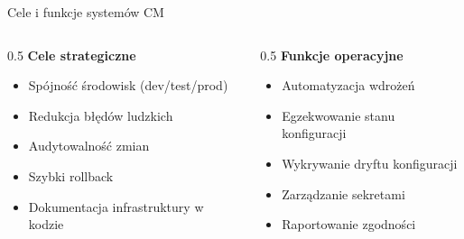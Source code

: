 \documentclass{beamer}
\begin{document}
\begin{frame}{Cele i funkcje system\'ow CM}
    \begin{columns}[T]
        \begin{column}{0.5\textwidth}
            \textbf{Cele strategiczne}
            \begin{itemize}
                \item Sp\'ojno\'s\'c \'{s}rodowisk (dev/test/prod)
                \item Redukcja b\l{}\k{e}d\'ow ludzkich
                \item Audytowalno\'s\'c zmian
                \item Szybki rollback
                \item Dokumentacja infrastruktury w kodzie
            \end{itemize}
        \end{column}
        \begin{column}{0.5\textwidth}
            \textbf{Funkcje operacyjne}
            \begin{itemize}
                \item Automatyzacja wdro\.ze\'n
                \item Egzekwowanie stanu konfiguracji
                \item Wykrywanie dryftu konfiguracji
                \item Zarz\k{a}dzanie sekretami
                \item Raportowanie zgodno\'sci
            \end{itemize}
        \end{column}
    \end{columns}
    \vspace{0.8em}
\end{frame}
\end{document}
